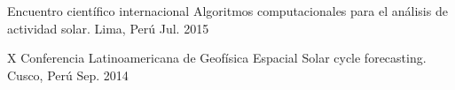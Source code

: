 \begin{cventries}
  \cventry
    {Encuentro científico internacional} %
    {Algoritmos computacionales para el análisis de actividad solar.} %
    {Lima, Perú} %
    {Jul. 2015} %
    {}

  \cventry
    {X Conferencia Latinoamericana de Geofísica Espacial} %
    {Solar cycle forecasting.} %
    {Cusco, Perú} %
    {Sep. 2014} %
    {}




\end{cventries}
